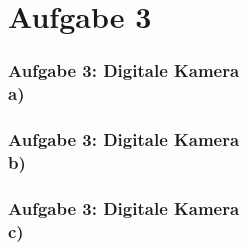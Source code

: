 \documentclass[accentcolor=tud1a,colorbacktitle,inverttitle,landscape,german,presentation,t]{tudbeamer}
\begin{document}
\section{Aufgabe 3}
	\begin{frame}
		\frametitle{Aufgabe 3: Digitale Kamera \\ a)}
	\end{frame}
	
	\begin{frame}
		\frametitle{Aufgabe 3: Digitale Kamera \\ b)}
	\end{frame}
	
	\begin{frame}
		\frametitle{Aufgabe 3: Digitale Kamera \\ c)}
	\end{frame}
\end{document}

